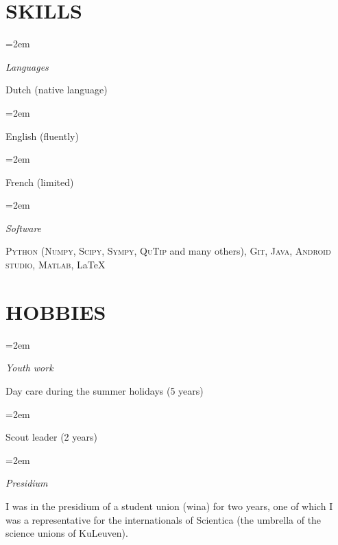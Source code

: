 \documentclass[paper=a4,fontsize=11pt]{scrartcl} %
\newlength{\spacebox}
\newcommand{\NewPart}[1]{\section*{\uppercase{#1}}}
\newcommand{\PersonalEntry}[2]{
		\noindent\hangindent=2em\hangafter=0 %
		\parbox{\spacebox}{        %
		\textit{#1}}		       %
		\hspace{1.5em} #2 \par}    %
\newcommand{\SkillsEntry}[2]{      %
		\noindent\hangindent=2em\hangafter=0 %
		\parbox{\spacebox}{        %
		\textit{#1}}			   %
		\hspace{1.5em} #2 \par}    %
\begin{document}
\NewPart{Skills}{}

\SkillsEntry{Languages}{Dutch (native language)}
\SkillsEntry{}{English (fluently)}
\SkillsEntry{}{French (limited)}

\SkillsEntry{Software}{\textsc{Python} (\textsc{Numpy}, \textsc{Scipy}, \textsc{Sympy}, \textsc{QuTip} and many others), \textsc{Git}, \textsc{Java}, \textsc{Android studio}, \textsc{Matlab}, \LaTeX}

\NewPart{Hobbies}{}

\SkillsEntry{Youth work}{Day care during the summer holidays (5 years)}
\SkillsEntry{}{Scout leader (2 years)}
\SkillsEntry{Presidium}{I was in the presidium of a student union (wina) for two years, one of which I was a representative for the internationals of Scientica (the umbrella of the science unions of KuLeuven).}
\begin{comment}
\NewPart{References}{}
Available upon request
\end{comment}



\end{document}

